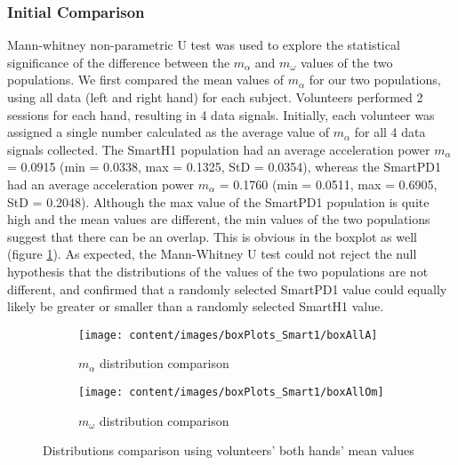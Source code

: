 \subsubsection{Initial Comparison}
\label{subsubsec:SmartCT1InitComp}
Mann-whitney non-parametric U test was used to explore the statistical significance of the difference between the $m_{\alpha}$ and $m_{\omega}$ values of the two populations. 
We first compared the mean values of $m_{\alpha}$ for our two populations, using all data (left and right hand) for each subject. Volunteers performed 2 sessions for each hand, resulting in 4 data signals. Initially, each volunteer was assigned a single number calculated as the average value of $m_{\alpha}$ for all 4 data signals collected. The \gls{SmartH1} population had an average acceleration power $m_{\alpha}$ = 0.0915 (min = 0.0338, max = 0.1325, StD = 0.0354), whereas the \gls{SmartPD1} had an average acceleration power $m_{\alpha}$ = 0.1760 (min = 0.0511, max = 0.6905, StD = 0.2048). Although the max value of the \gls{SmartPD1} population is quite high and the mean values are different, the min values of the two populations suggest that there can be an overlap. This is obvious in the boxplot as well (figure \ref{fig:boxAllA}). As expected, the Mann-Whitney U test could not reject the null hypothesis that the distributions of the values of the two populations are not different, and  confirmed that a randomly selected \gls{SmartPD1} value could equally likely be greater or smaller than a randomly selected \gls{SmartH1} value. 

\begin{figure}[h]
\centering
\begin{subfigure}{.5\textwidth}
  \centering
  \texttt{[image: content/images/boxPlots\_Smart1/boxAllA]}
  \caption{$m_{\alpha}$ distribution comparison}
  \label{fig:boxAllA}
\end{subfigure}%
\begin{subfigure}{.5\textwidth}
  \centering
  \texttt{[image: content/images/boxPlots\_Smart1/boxAllOm]}
  \caption{$m_{\omega}$ distribution comparison}
  \label{fig:boxAllOm}
\end{subfigure}
\caption{Distributions comparison using volunteers' both hands' mean values}
\label{fig:boxAll}
\end{figure}

